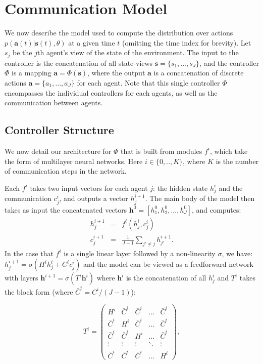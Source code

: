 \documentclass{article}
\begin{document}
\section{Communication Model}
\vspace{-2mm}
We now describe the model used to compute the distribution over
actions $p(\mathbf{a}(t)|\mathbf{s}(t),\theta)$ at a
given time $t$ (omitting the time index for brevity). 
Let $s_j$ be the $j$th agent's view of the state of the
environment.  The input to the controller is the concatenation of all
state-views $\mathbf{s} = \{s_1,..., s_J\}$,
and the controller $\Phi$ is a mapping
$\mathbf{a} = \Phi(\mathbf{s})$, where the output $\mathbf{a}$ is a
concatenation of discrete actions $\mathbf{a} = \{a_1, ... ,a_J\}$ for each
agent. Note that this single controller $\Phi$ encompasses the
individual controllers for each agents, as well as the communication
between agents.


\vspace{-3mm}
\subsection{Controller Structure}
\vspace{-1.5mm} 
We now detail our architecture for $\Phi$ that is built from modules $f^i$, which take the form of multilayer
neural networks. Here $i\in \{0,..,K\}$, where $K$ is the number of
communication steps in the network.  

Each $f^i$ takes two input vectors for each agent $j$: the hidden state $h_j^i$ and
the communication $c_j^i$, and outputs a vector $h_j^{i+1}$.  The
main body of the model then takes as input the concatenated vectors
$\mathbf{h}^0 = [h^0_1, h^0_2, ..., h^0_J]$, and computes:
\begin{eqnarray} 
h^{i+1}_j &=& f^i(h^{i}_j, c^{i}_j) \label{eq:streamlayer} \\
c^{i+1}_j &=& \frac{1}{J-1} \sum_{j'\neq j} h^{i+1}_{j'}.\label{eq:mean_communication} 
\end{eqnarray}
In the case that $f^i$ is a single linear layer followed by a
non-linearity $\sigma$, we have:
$h^{i+1}_j = \sigma(H^ih^{i}_j+ C^ic^{i}_j)$ and the model can be
viewed as a feedforward network with layers $\mathbf{h}^{i+1} = \sigma(T^{i}\mathbf{h}^{i})$ where
$\mathbf{h}^i$ is the concatenation of all $h^i_j$ and $T^i$ takes the
block form (where $\bar{C}^i = C^i/(J-1)$):

{\small
\[T^i = \begin{pmatrix}
	H^i & \bar{C}^i & \bar{C}^i & ... & \bar{C}^i \\
 	\bar{C}^i & H^i & \bar{C}^i &... & \bar{C}^i \\	
	\bar{C}^i & \bar{C}^i & H^i & ... & \bar{C}^i \\
\vdots  & \vdots &\vdots & \ddots & \vdots \\
	\bar{C}^i & \bar{C}^i & \bar{C}^i &... & H^i 
	\end{pmatrix}
,	\]}
\end{document}
